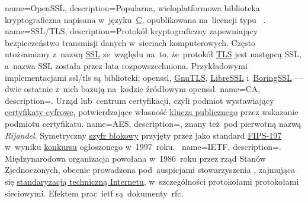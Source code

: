 {
	name={OpenSSL},
	description={Popularna, wieloplatformowa biblioteka kryptograficzna napisana w~języku~\href{https://en.wikipedia.org/wiki/C_(programming_language)}{C}, opublikowana na~licencji typu ~\cite{openssl}.}
}
{
	name={SSL/TLS},
	description={Protokół kryptograficzny zapewniający bezpieczeństwo transmisji danych w~sieciach komputerowych. Często utożsamiany z~nazwą \href{https://en.wikipedia.org/wiki/Secure_Sockets_Layer}{SSL} ze~względu na~to, że~protokół \href{https://en.wikipedia.org/wiki/Secure_Sockets_Layer}{TLS} jest następcą SSL, a~nazwa SSL została przez lata rozpowszechniona. Przykładowymi implementacjami \gls{ssl/tls} są biblioteki: \gls{openssl}, \href{https://en.wikipedia.org/wiki/GnuTLS}{GnuTLS}, \href{https://en.wikipedia.org/wiki/LibreSSL}{LibreSSL} i~\href{https://boringssl.googlesource.com/boringssl/}{BoringSSL} --- dwie ostatnie z~nich bazują na~kodzie źródłowym \gls{openssl}.}
}
{
	name={CA},
	description={. Urząd lub~centrum certyfikacji, czyli podmiot wystawiający \href{https://en.wikipedia.org/wiki/Public_key_certificate}{certyfikaty cyfrowe}, potwierdzające własność \href{https://en.wikipedia.org/wiki/Public-key_cryptography}{klucza publicznego} przez wskazanie podmiotu certyfikatu.}
}
{
	name={AES},
	description={, znany też~pod pierwotną nazwą \emph{Rijandel}. Symetryczny \href{https://en.wikipedia.org/wiki/Block_cipher}{szyfr blokowy} przyjęty przez  jako standard \href{http://nvlpubs.nist.gov/nistpubs/FIPS/NIST.FIPS.197.pdf}{FIPS-197} w~wyniku \href{https://en.wikipedia.org/wiki/Advanced_Encryption_Standard_process}{konkursu} ogłoszonego w~1997~roku.~\cite{aes-fips197}}
}
{
	name={IETF},
	description={. Międzynarodowa organizacja powołana w~1986~roku przez rząd Stanów Zjednoczonych, obecnie prowadzona pod~auspicjami stowarzyszenia , zajmująca się \href{https://en.wikipedia.org/wiki/Internet_Standard}{standaryzacją techniczną Internetu}, w~szczególności protokołami protokołami sieciowymi. Efektem prac~\gls{ietf} są~dokumenty~\gls{rfc}.}
}
